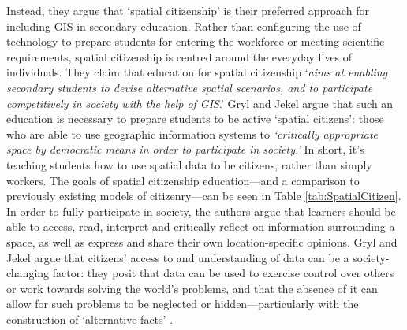Instead, they argue that `spatial citizenship' is their preferred approach for including GIS in secondary education. Rather than configuring the use of technology to prepare students for entering the workforce or meeting scientific requirements, spatial citizenship is centred around the everyday lives of individuals. They claim that education for spatial citizenship `\textit{aims at enabling secondary students to devise alternative spatial scenarios, and to participate competitively in society with the help of GIS}.' Gryl and Jekel argue that such an education is necessary to prepare students to be active `spatial citizens': those who are able to use geographic information systems to \textit{`critically appropriate space by democratic means in order to participate in society.’} In short, it's teaching students how to use spatial data to be citizens, rather than simply workers. The goals of spatial citizenship education---and a comparison to previously existing models of citizenry---can be seen in Table \ref{tab:SpatialCitizen}. In order to fully participate in society, the authors argue that learners should be able to access, read, interpret and critically reflect on information surrounding a space, as well as express and share their own location-specific opinions. Gryl and Jekel argue that citizens' access to and understanding of data can be a society-changing factor: they posit that data can be used to exercise control over others or work towards solving the world's problems, and that the absence of it can allow for such problems to be neglected or hidden---particularly with the construction of `alternative facts' \citep{gryl2018}. 

